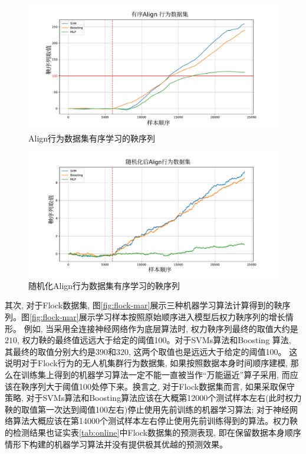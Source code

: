 \begin{figure}[htbp] %
\centerline{\includegraphics[width=1\linewidth]{Img/chapter9/Align data set-icml}}
\caption{{Align}行为数据集有序学习的鞅序列}
\label{fig:align-mar}
\end{figure}
\begin{figure}[htbp] %
\centerline{
\includegraphics[width=1\linewidth]{Img/chapter9/Randomly shuffling Align data sett-icml}}
\caption{随机化{Align}行为数据集有序学习的鞅序列}
\label{fig:radom-align-mar}
\end{figure}


其次, 对于Flock数据集, 图\ref{fig:flock-mar}展示三种机器学习算法计算得到的鞅序列。图\ref{fig:flock-mar}展示学习样本按照原始顺序进入模型后权力鞅序列的增长情形。 例如, 当采用全连接神经网络作为底层算法时, 权力鞅序列最终的取值大约是$210$, 权力鞅的最终值远远大于给定的阈值100。对于SVMs算法和Boosting 算法, 其最终的取值分别大约是$390$和$320$, 这两个取值也是远远大于给定的阈值100。 这说明对于Flock行为的无人机集群行为数据集, 如果按照数据本身时间顺序建模, 那么在训练集上得到的机器学习算法一定不能一直被当作“万能逼近”算子采用, 而应该在鞅序列大于阈值100处停下来。换言之, 对于Flock数据集而言, 如果采取保守策略, 对于SVMs算法和Boosting算法应该在大概第12000个测试样本左右(此时权力鞅的取值第一次达到阈值100左右)停止使用先前训练的机器学习算法; 对于神经网络算法大概应该在第14000个测试样本左右停止使用先前训练得到的算法。权力鞅的检测结果也证实表\ref{tab:online}中Flock数据集的预测表现, 即在保留数据本身顺序情形下构建的机器学习算法并没有提供极其优越的预测效果。

